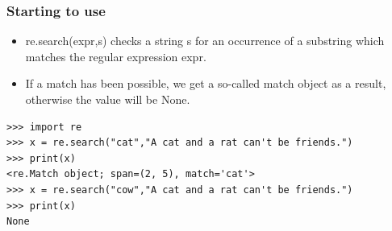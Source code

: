  \begin{frame}[fragile]
\frametitle{Starting to use}

\begin{itemize}
\item re.search(expr,s) checks a string s for an occurrence of a substring which matches the regular expression expr.
\item If a match has been possible, we get a so-called match object as a result, otherwise the value will be None.
\end{itemize}

\begin{lstlisting}
>>> import re
>>> x = re.search("cat","A cat and a rat can't be friends.")
>>> print(x)
<re.Match object; span=(2, 5), match='cat'>
>>> x = re.search("cow","A cat and a rat can't be friends.")
>>> print(x)
None
\end{lstlisting}

\end{frame}

